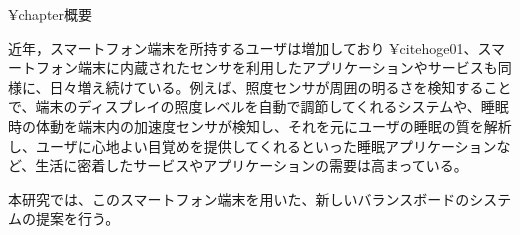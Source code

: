 

¥chapter{概要}

近年，スマートフォン端末を所持するユーザは増加しており ¥cite{hoge01}、スマートフォン端末に内蔵されたセンサを利用したアプリケーションやサービスも同様に、日々増え続けている。例えば、照度センサが周囲の明るさを検知することで、端末のディスプレイの照度レベルを自動で調節してくれるシステムや、睡眠時の体動を端末内の加速度センサが検知し、それを元にユーザの睡眠の質を解析し、ユーザに心地よい目覚めを提供してくれるといった睡眠アプリケーションなど、生活に密着したサービスやアプリケーションの需要は高まっている。

本研究では、このスマートフォン端末を用いた、新しいバランスボードのシステムの提案を行う。

